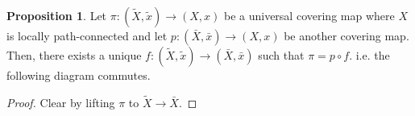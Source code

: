 \documentclass[]{article}
\theoremstyle{definition}
\theoremstyle{definition}
\newtheorem{proposition}{Proposition}[section]
\begin{document}
\begin{proposition}
  Let \(\pi : (\tilde X, \tilde x) \to (X, x)\) be a universal covering map where \(X\) is locally 
  path-connected and let \(p : (\bar X, \bar x) \to (X, x)\) be another covering map.
  Then, there exists a unique \(f : (\tilde X, \tilde x) \to (\bar X, \bar x)\)
  such that \(\pi = p \circ f\). i.e. the following diagram commutes.
\end{proposition}
\begin{proof}
  Clear by lifting \(\pi\) to \(\tilde X \to \bar X\).
\end{proof}
\end{document}
